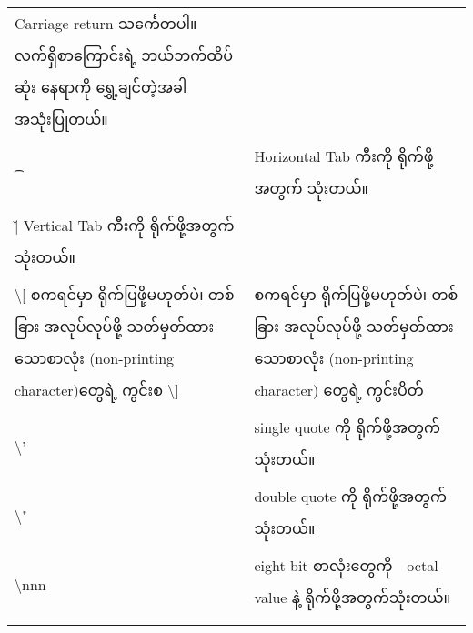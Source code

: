 \documentclass[11pt]{article}
\begin{document}
\begin{longtable}[c]{@{}ll@{}}
\begin{minipage}[t]{0.73\columnwidth}
Carriage return သင်္ကေတပါ။ လက်ရှိစာကြောင်းရဲ့ ဘယ်ဘက်ထိပ်ဆုံး နေရာကို
ရွှေ့ချင်တဲ့အခါ အသုံးပြုတယ်။
\strut\end{minipage}\tabularnewline
\begin{minipage}[t]{0.21\columnwidth}\raggedright\strut
\t 
\strut\end{minipage} &
\begin{minipage}[t]{0.73\columnwidth}\raggedright\strut
Horizontal Tab ကီးကို ရိုက်ဖို့အတွက် သုံးတယ်။
\strut\end{minipage}\tabularnewline
\begin{minipage}[t]{0.21\columnwidth}\raggedright\strut
\v | Vertical Tab ကီးကို ရိုက်ဖို့အတွက် သုံးတယ်။
\strut\end{minipage}\tabularnewline
\begin{minipage}[t]{0.21\columnwidth}\raggedright\strut
\textbackslash{}‌{[} \textbar{} စကရင်မှာ ရိုက်ပြဖို့မဟုတ်ပဲ၊ တစ်ခြား
အလုပ်လုပ်ဖို့ သတ်မှတ်ထားသောစာလုံး (non-printing character)တွေရဲ့ ကွင်းစ
\textbar{} \textbar{} \textbackslash{}‌{]}
\strut\end{minipage} &
\begin{minipage}[t]{0.73\columnwidth}\raggedright\strut
စကရင်မှာ ရိုက်ပြဖို့မဟုတ်ပဲ၊ တစ်ခြား အလုပ်လုပ်ဖို့ သတ်မှတ်ထားသောစာလုံး
(non-printing character) တွေရဲ့ ကွင်းပိတ်
\strut\end{minipage}\tabularnewline
\begin{minipage}[t]{0.21\columnwidth}\raggedright\strut
\textbackslash{}'
\strut\end{minipage} &
\begin{minipage}[t]{0.73\columnwidth}\raggedright\strut
single quote ကို ရိုက်ဖို့အတွက်သုံးတယ်။
\strut\end{minipage}\tabularnewline
\begin{minipage}[t]{0.21\columnwidth}\raggedright\strut
\textbackslash{}"
\strut\end{minipage} &
\begin{minipage}[t]{0.73\columnwidth}\raggedright\strut
double quote ကို ရိုက်ဖို့အတွက်သုံးတယ်။
\strut\end{minipage}\tabularnewline
\begin{minipage}[t]{0.21\columnwidth}\raggedright\strut
\textbackslash{}nnn
\strut\end{minipage} &
\begin{minipage}[t]{0.73\columnwidth}\raggedright\strut
eight-bit စာလုံးတွေကို　octal value နဲ့ ရိုက်ဖို့အတွက်သုံးတယ်။
\strut\end{minipage}\tabularnewline
\begin{minipage}[t]{0.21\columnwidth}\raggedright\strut

\end{minipage}
\end{longtable}
\end{document}
